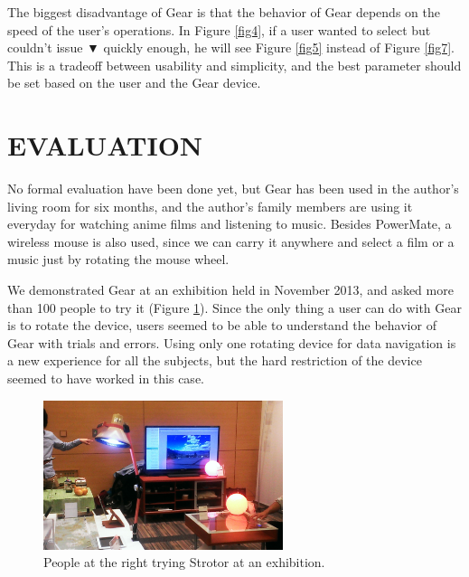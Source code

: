 \documentclass{article}
\def\down{▼}
\begin{document}
The biggest disadvantage of Gear is that
the behavior of Gear depends on the speed of the user's operations.
In Figure \ref{fig4},
if a user wanted to select  but couldn't issue {\down}
quickly enough, he will see Figure \ref{fig5} instead of Figure \ref{fig7}.
This is a tradeoff between usability and simplicity, and
the best parameter should be set based on the user and the Gear device.

\section*{EVALUATION}

No formal evaluation have been done yet, but Gear has been used in the author's
living room for six months, and the author's family members are using it
everyday for watching anime films and listening to music.
Besides PowerMate, a wireless mouse is also used,
since we can carry it anywhere and select
a film or a music just by rotating the mouse wheel.

We demonstrated Gear at an exhibition
held in November 2013, and asked more than 100 people to try it
(Figure \ref{exhibition}).
%
Since the only thing a user can do with Gear is to rotate the device,
users seemed to be able to understand the behavior of Gear with trials and errors.
% 
% 
Using only one rotating device for data navigation is a new experience for
all the subjects, but the hard restriction of the device seemed to have worked in this case.

\begin{figure}[H]
\centerline{\includegraphics[width=70mm,bb=0 0 527 329]{figures/c520d5dfbd06c532d48d324a7019b00c.png}}
\caption{People at the right trying Strotor at an exhibition.}
\label{exhibition}
\end{figure}

\end{document}

